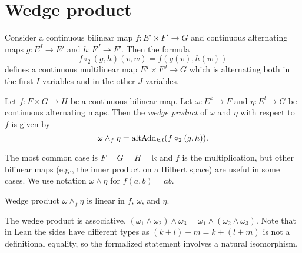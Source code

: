 \section{Wedge product}%
\label{sec:wedge-product}

\begin{definition}%
  \label{def:clm-comp2-cam}
  Consider a continuous bilinear map \(f \colon E' \times F' \to G\)
  and continuous alternating maps \(g\colon E^{I}\to E'\) and \(h\colon F^{J}\to F'\).
  Then the formula
  \[
    f \circ_{2} (g, h)(v, w) = f(g(v), h(w))
  \]
  defines a continuous multilinear map \(E^{I}\times F^{J}\to G\)
  which is alternating both in the first \(I\) variables and in the other \(J\) variables.
\end{definition}

\begin{definition}%
  \label{def:cam-wedge}
  Let \(f \colon F \times G \to H\) be a continuous bilinear map.
  Let \(\omega \colon E^{k} \to F\) and \(\eta\colon E^{l}\to G\) be continuous alternating maps.
  Then the \emph{wedge product} of \(\omega\) and \(\eta\) with respect to \(f\) is given by
  \[
    \omega \wedge_{f} \eta = \operatorname{altAdd}_{k, l}(f \circ_{2}(g, h)).
  \]
\end{definition}

The most common case is \(F = G = H = \mathbb k\) and \(f\) is the multiplication,
but other bilinear maps (e.g., the inner product on a Hilbert space) are useful in some cases.
We use notation \(\omega \wedge \eta\) for \(f(a, b) = ab\).


\begin{theorem}%
  \label{thm:wedge-clm3}
  Wedge product \(\omega \wedge_{f} \eta\) is linear in \(f\), \(\omega\), and \(\eta\).
\end{theorem}

\begin{theorem}%
  \label{thm:wedge-assoc}
  The wedge product is associative, \((\omega_{1}\wedge \omega_{2})\wedge \omega_{3} = \omega_{1}\wedge (\omega_{2}\wedge \omega_{3})\).
  Note that in Lean the sides have different types as \((k + l) + m = k + (l + m)\) is not a definitional equality,
  so the formalized statement involves a natural isomorphism.
\end{theorem}

